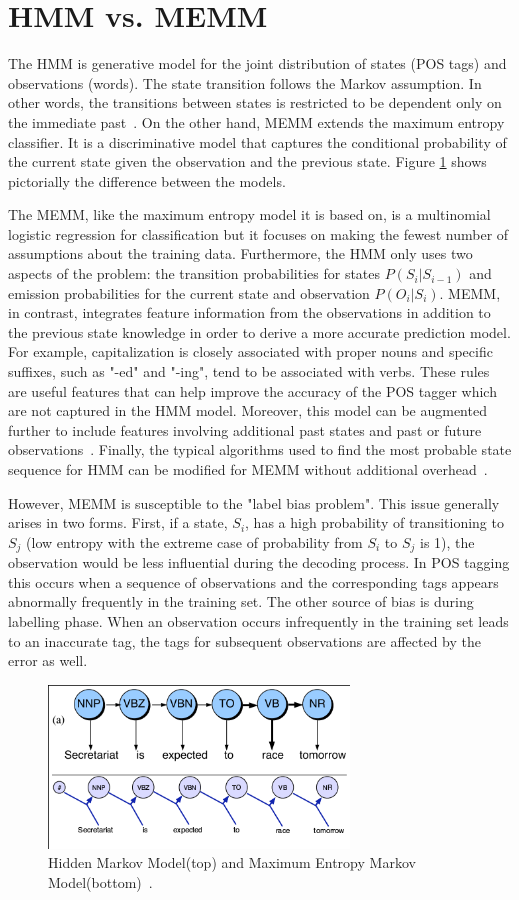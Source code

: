 \section{HMM vs. MEMM}
The HMM is generative model for the joint distribution of states (POS tags) and observations (words). The state transition follows the Markov assumption. In other words, the transitions between states is restricted to be dependent only on the immediate past~\cite{nlpBook}. On the other hand, MEMM extends the maximum entropy classifier. It is a discriminative model that captures the conditional probability of the current state given the observation and the previous state. Figure \ref{hmmVmemm} shows pictorially the difference between the models.

The MEMM, like the maximum entropy model it is based on, is a multinomial logistic regression for classification but it focuses on making the fewest number of assumptions about the training data. Furthermore, the HMM only uses two aspects of the problem: the transition probabilities for states $P( S_i | S_{i-1} )$ and emission probabilities for the current state and observation $P( O_i | S_i )$. MEMM, in contrast, integrates feature information from the observations in addition to the previous state knowledge in order to derive a more accurate prediction model. For example, capitalization is closely associated with proper nouns and specific suffixes, such as "-ed" and "-ing", tend to be associated with verbs. These rules are useful features that can help improve the accuracy of the POS tagger which are not captured in the HMM model. Moreover, this model can be augmented further to include features involving additional past states and past or future observations~\cite{nlpBook}. Finally, the typical algorithms used to find the most probable state sequence for HMM can be modified for MEMM without additional overhead~\cite{memmPaper}.

However, MEMM is susceptible to the "label bias problem". This issue generally arises in two forms. First, if a state, $S_i$, has a high probability of transitioning to $S_j$ (low entropy with the extreme case of probability from $S_i$ to $S_j$ is 1), the observation would be less influential during the decoding process. In POS tagging this occurs when a sequence of observations and the corresponding tags appears abnormally frequently in the training set. The other source of bias is during labelling phase. When an observation occurs infrequently in the training set leads to an inaccurate tag, the tags for subsequent observations are affected by the error as well. \cite{labelBiasProblem}

\begin{figure}[ht]
\centering
\includegraphics[width=80mm]{figures/memm.png}
\caption{Hidden Markov Model(top) and Maximum Entropy Markov Model(bottom)~\cite{nlpBook}. \label{hmmVmemm}}
\end{figure}